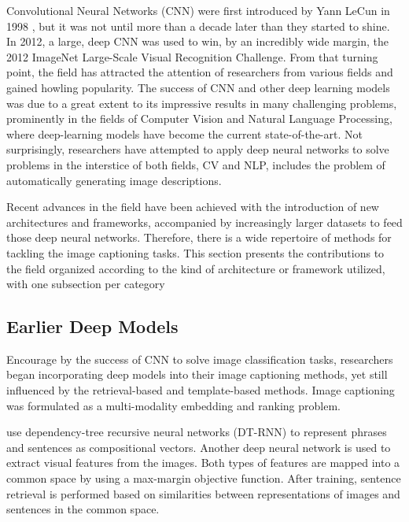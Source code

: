 Convolutional Neural Networks (CNN) were first introduced by Yann LeCun in 1998 \citep{Lecun1998}, but it was not until more than a decade later than they started to shine. In 2012, a large, deep CNN \citep{Krizhevsky2012} was used to win, by an incredibly wide margin, the 2012 ImageNet Large-Scale Visual Recognition Challenge. From that turning point, the field has attracted the attention of researchers from various fields and gained howling popularity. The success of CNN and other deep learning models was due to a great extent to its impressive results in many challenging problems, prominently in the fields of Computer Vision and Natural Language Processing, where deep-learning models have become the current state-of-the-art. Not surprisingly, researchers have attempted to apply deep neural networks to solve problems in the interstice of both fields, CV and NLP, includes the problem of automatically generating image descriptions.

Recent advances in the field have been achieved with the introduction of new architectures and frameworks, accompanied by increasingly larger datasets to feed those deep neural networks. Therefore, there is a wide repertoire of methods for tackling the image captioning tasks. This section presents the contributions to the field organized according to the kind of architecture or framework utilized, with one subsection per category

\subsection{Earlier Deep Models}\label{subsec:earlier_deep-learning_models}

Encourage by the success of CNN to solve image classification tasks, researchers began incorporating deep models into their image captioning methods, yet still influenced by the retrieval-based and template-based methods. Image captioning was formulated as a multi-modality embedding \citet{Frome2013} and ranking problem.

\citet{Socher2014} use dependency-tree recursive neural networks (DT-RNN) to represent phrases and sentences as compositional vectors. Another deep neural network \citep{Le2013} is used to extract visual features from the images. Both types of features are mapped into a common space by using a max-margin objective function. After training, sentence retrieval is performed based on similarities between representations of images and sentences in the common space.

